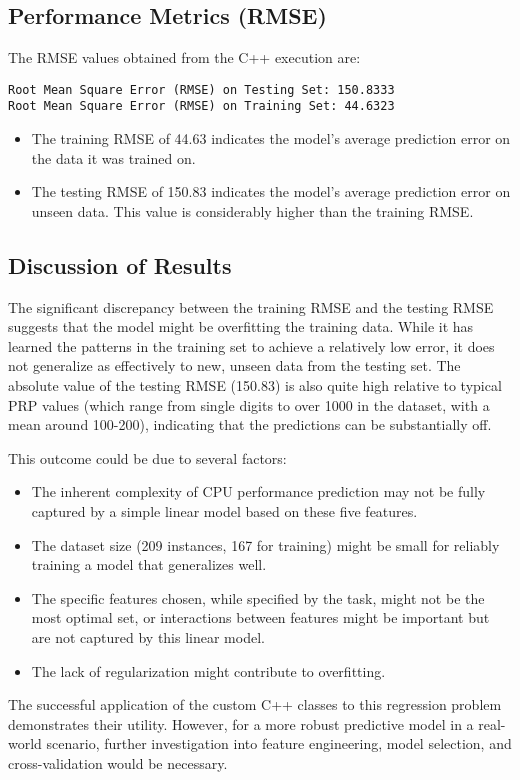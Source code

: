 \subsection{Performance Metrics (RMSE)}
The RMSE values obtained from the C++ execution are:
\begin{verbatim}
Root Mean Square Error (RMSE) on Testing Set: 150.8333
Root Mean Square Error (RMSE) on Training Set: 44.6323
\end{verbatim}
\begin{itemize}
    \item The training RMSE of 44.63 indicates the model's average prediction error on the data it was trained on.
    \item The testing RMSE of 150.83 indicates the model's average prediction error on unseen data. This value is considerably higher than the training RMSE.
\end{itemize}

\subsection{Discussion of Results}
The significant discrepancy between the training RMSE and the testing RMSE suggests that the model might be overfitting the training data. While it has learned the patterns in the training set to achieve a relatively low error, it does not generalize as effectively to new, unseen data from the testing set. The absolute value of the testing RMSE (150.83) is also quite high relative to typical PRP values (which range from single digits to over 1000 in the dataset, with a mean around 100-200), indicating that the predictions can be substantially off.

This outcome could be due to several factors:
\begin{itemize}
    \item The inherent complexity of CPU performance prediction may not be fully captured by a simple linear model based on these five features.
    \item The dataset size (209 instances, 167 for training) might be small for reliably training a model that generalizes well.
    \item The specific features chosen, while specified by the task, might not be the most optimal set, or interactions between features might be important but are not captured by this linear model.
    \item The lack of regularization might contribute to overfitting.
\end{itemize}
The successful application of the custom C++ classes to this regression problem demonstrates their utility. However, for a more robust predictive model in a real-world scenario, further investigation into feature engineering, model selection, and cross-validation would be necessary.